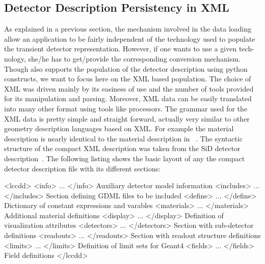 \documentclass[10pt,a4paper]{article}
\begin{document}
\newpage
\subsection{Detector Description Persistency in XML}
\label{sec:compact-xml-structure}
\noindent
As explained in a previous section, the mechanism involved in the data loading 
allow an application to be fairly independent of the technology used to populate
the transient detector representation. However, if one wants to use a given tech-
nology, she/he has to get/provide the corresponding conversion mechanism.
Though \DDhep also supports the population of the detector description using 
python constructs, we want to focus here on the XML based population.
The choice of XML was driven mainly by its easiness of use and the number 
of tools provided for its manipulation and parsing. Moreover, XML data
can be easily translated into many other format using tools like  
processors.
The grammar used for the XML data is pretty simple and straight forward, 
actually very similar to other geometry description languages based
on XML. For example the material description is nearly identical
to the material description in ~\cite{bib:GDML}.
The syntactic structure of the compact XML description was taken from
the SiD detector description~\cite{bib:LCDD}.
The following listing shows the basic layout of any
the compact detector description file with its different sections:

\begin{code}
<lccdd>
    <info>          ...    </info>             Auxiliary detector model information
    <includes>      ...    </includes>         Section defining GDML files to be included
    <define>        ...    </define>           Dictionary of constant expressions and varables
    <materials>     ...    </materials>        Additional material definitions
    <display>       ...    </display>          Definition of visualization attributes
    <detectors>     ...    </detectors>        Section with sub-detector definitions
    <readouts>      ...    </readouts>         Section with readout structure definitions
    <limits>        ...    </limits>           Definition of limit sets for Geant4
    <fields>        ...    </fields>           Field definitions
</lccdd>
\end{code}
\end{document}
